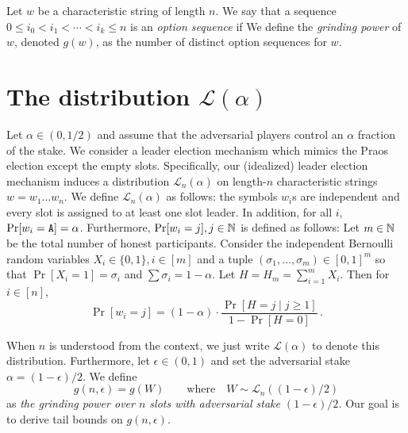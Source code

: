 \begin{definition}\label{def:option-sequence}
  Let $w$ be a characteristic string of length $n$. 
  We say that a sequence
  $
    0 \leq i_0 < i_1 < \cdots < i_k \leq n
  $
  is an \emph{option sequence} if
  We define the \emph{grinding power} of $w$, denoted $g(w)$, 
  as the 
  number of distinct option sequences for $w$.
\end{definition}




\section{The distribution $\mathcal{L}(\alpha)$}
Let $\alpha \in (0, 1/2)$ 
and assume that the adversarial players control an $\alpha$ 
fraction of the stake. 
We consider a leader election mechanism 
which mimics the Praos election except the empty slots. 
Specifically, 
our (idealized) leader election mechanism 
induces 
a distribution $\mathcal{L}_n(\alpha)$ 
on length-$n$ characteristic strings $w = w_1 \ldots w_n$. 
We define $\mathcal{L}_n(\alpha)$ as follows: 
the symbols $w_i$s are independent 
and 
every slot is assigned to at least one slot leader. 
In addition, for all $i$, $\Pr[w_i = \mathtt{A}] = \alpha$.
Furthermore, $\Pr[w_i = j], j \in \mathbb{N}$ is defined as follows: 
Let $m \in \mathbb{N}$ be the total number of honest participants. 
Consider the independent Bernoulli random variables $X_i \in \{0, 1\}, i \in [m]$ 
and a tuple $(\sigma_1, \ldots, \sigma_m) \in [0,1]^m$ 
so that $\Pr[X_i = 1] = \sigma_i$ 
and $\sum \sigma_i = 1 - \alpha$. 
Let $H = H_m = \sum_{i =1}^m X_i$. 
Then for $i \in [n]$, 
$$
  \Pr[w_i = j] = (1-\alpha)\cdot
    \frac{\Pr[H = j \mid j \geq 1]}{1 - \Pr[H = 0]}
    \,.
$$

When $n$ is understood from the context, 
we just write $\mathcal{L}(\alpha)$ to denote this distribution. 
Furthermore, let $\epsilon \in (0,1)$ and set 
the adversarial stake $\alpha = (1-\epsilon)/2$. 
We define 
\begin{equation}\label{eq:praos-gneps}
  g(n,\epsilon) = g(W) \qquad \text{where} \quad W \sim \mathcal{L}_n((1-\epsilon)/2)
\end{equation}
as \emph{the grinding power over $n$ slots with adversarial stake $(1-\epsilon)/2$.}
Our goal is to derive tail bounds on $g(n,\epsilon)$.













